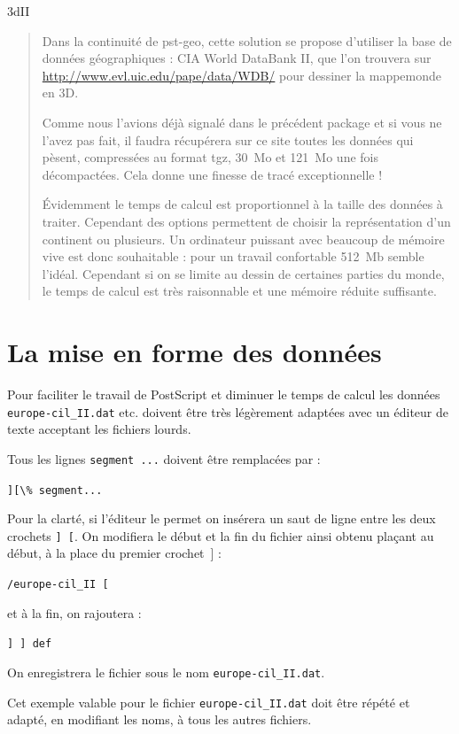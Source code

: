 \documentclass[11pt,french,BCOR10mm,DIV12,bibliography=totoc,parskip=false,
   smallheadings, headexclude,footexclude,oneside]{pst-doc}
\begin{document}
\par{3dII}
 \begin{quote}
 Dans la continuité de \textsf{pst-geo}, cette solution se propose
d'utiliser la base de données géographiques : \textsf{CIA World DataBank II}, que l'on trouvera sur
\url{http://www.evl.uic.edu/pape/data/WDB/} pour dessiner la
mappemonde en 3D.

Comme nous l'avions déjà signalé dans le précédent package et si vous ne l'avez pas fait, il faudra récupérera sur ce
site toutes les données qui pèsent, compressées au format
\textsf{tgz},  30~Mo et 121~Mo une fois décompactées. Cela donne
une finesse de tracé exceptionnelle !

\'Evidemment le temps de calcul est proportionnel à la taille des
données à traiter. Cependant des options permettent de choisir la
représentation d'un continent ou plusieurs. Un ordinateur puissant
avec beaucoup de mémoire vive est donc souhaitable : pour un travail confortable 512~Mb semble l'idéal. Cependant si
on se limite au dessin de certaines parties du monde, le temps de
calcul est très raisonnable et une mémoire réduite suffisante.
 \end{quote}


\section{La mise en forme des données}
Pour faciliter le travail de PostScript et diminuer le temps de
calcul les données \verb|europe-cil_II.dat| etc. doivent être très
légèrement adaptées avec un éditeur de texte acceptant les
fichiers lourds.

Tous les lignes \texttt{segment ...} doivent être remplacées par :

\verb|][\% segment...|

Pour la clarté, si l'éditeur le permet
on insérera un saut de ligne entre les deux crochets \texttt{] [}.
On modifiera le début et la fin du fichier ainsi obtenu plaçant au
début, à la place du premier crochet~] :

\verb|/europe-cil_II [|

et à la fin, on rajoutera :

\verb|] ] def|

On enregistrera le fichier sous le nom \verb|europe-cil_II.dat|.

Cet exemple valable pour le fichier \verb|europe-cil_II.dat| doit
être répété et adapté, en modifiant les noms, à tous les autres
fichiers.
\end{document}
